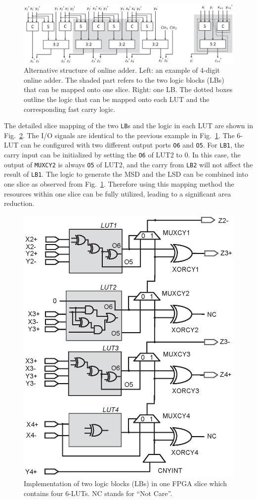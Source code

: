 \documentclass[conference]{IEEEtran}
\begin{document}

\begin{figure}[tbp]
	\centering
	\includegraphics[width=.85\textwidth]{./Figures/SDadder_FPGA_New_4digit.eps}
	\vspace{-1ex}
	\caption{Alternative structure of online adder. Left: an example of 4-digit online adder. The shaded part refers to the two logic blocks (LBs) that can be mapped onto one slice. Right: one LB. The dotted boxes outline the logic that can be mapped onto each LUT and the corresponding fast carry logic.}
	\vspace{-1ex}	
	\label{Fig:ModifiedOA}
\end{figure}

The detailed slice mapping of the two \texttt{LB}s and the logic in each LUT are shown in Fig.~\ref{Fig:SliceNew}. The I/O signals are identical to the previous example in Fig.~\ref{Fig:ModifiedOA}. The 6-LUT can be configured with two different output ports \texttt{O6} and \texttt{O5}. For \texttt{LB1}, the carry input can be initialized by setting the \texttt{O6} of LUT2 to 0. In this case, the output of \texttt{MUXCY2} is always \texttt{O5} of LUT2, and the carry from \texttt{LB2} will not affect the result of \texttt{LB1}. The logic to generate the MSD and the LSD can be combined into one slice as observed from Fig.~\ref{Fig:ModifiedOA}. Therefore using this mapping method the resources within one slice can be fully utilized, leading to a significant area reduction.\vspace{-0.5ex}

\begin{figure}[tbp]
	\centering
	\includegraphics[width=.45\textwidth]{./Figures/SDadder_FastCarry_New.eps}
	\caption{Implementation of two logic blocks (LBs) in one FPGA slice which contains four 6-LUTs. NC stands for ``Not Care''.}
	\label{Fig:SliceNew}
\end{figure}
\end{document}
